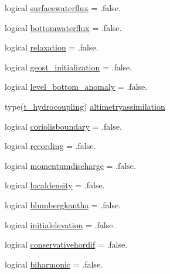 \begin{DoxyCompactItemize}
\item 
logical \mbox{\hyperlink{structmodulehydrodynamic_1_1t__hydrooptions_a373fad8aaaa9862f1e1b61d6fa36bc5b}{surfacewaterflux}} = .false.
\item 
logical \mbox{\hyperlink{structmodulehydrodynamic_1_1t__hydrooptions_a11d272d651a0e81a9548764ed10fd89e}{bottomwaterflux}} = .false.
\item 
logical \mbox{\hyperlink{structmodulehydrodynamic_1_1t__hydrooptions_a999549473d5cfcbf7e4ce2a6a41b1a21}{relaxation}} = .false.
\item 
logical \mbox{\hyperlink{structmodulehydrodynamic_1_1t__hydrooptions_a54908ea2cb852a8856a75736d9a2bd24}{geost\+\_\+initialization}} = .false.
\item 
logical \mbox{\hyperlink{structmodulehydrodynamic_1_1t__hydrooptions_a825da93960b08d7bee365067d637bf75}{level\+\_\+bottom\+\_\+anomaly}} = .false.
\item 
type(\mbox{\hyperlink{structmodulehydrodynamic_1_1t__hydrocoupling}{t\+\_\+hydrocoupling}}) \mbox{\hyperlink{structmodulehydrodynamic_1_1t__hydrooptions_a47ec6c416b63db3faf572e875223ab35}{altimetryassimilation}}
\item 
logical \mbox{\hyperlink{structmodulehydrodynamic_1_1t__hydrooptions_af3ea6647424731b6375f0425636e8390}{coriolisboundary}} = .false.
\item 
logical \mbox{\hyperlink{structmodulehydrodynamic_1_1t__hydrooptions_afffa564d29bb1a1994b978a1f8f6d6a4}{recording}} = .false.
\item 
logical \mbox{\hyperlink{structmodulehydrodynamic_1_1t__hydrooptions_a2e77ef613002d1bcdf005e8ab5393556}{momentumdischarge}} = .false.
\item 
logical \mbox{\hyperlink{structmodulehydrodynamic_1_1t__hydrooptions_ae8e5051e92f56d7e79a435f34195ee7d}{localdensity}} = .false.
\item 
logical \mbox{\hyperlink{structmodulehydrodynamic_1_1t__hydrooptions_a70d3193229df896527a2f1f6ff7e98c5}{blumbergkantha}} = .false.
\item 
logical \mbox{\hyperlink{structmodulehydrodynamic_1_1t__hydrooptions_aaecb867d9dee7043adfca6c8e7602568}{initialelevation}} = .false.
\item 
logical \mbox{\hyperlink{structmodulehydrodynamic_1_1t__hydrooptions_a418725aedf23efa67648ddbf2bedb24e}{conservativehordif}} = .false.
\item 
logical \mbox{\hyperlink{structmodulehydrodynamic_1_1t__hydrooptions_ab88ed57301d5a7a02f7bd0daa477e2b0}{biharmonic}} = .false.
\item 

\end{DoxyCompactItemize}
